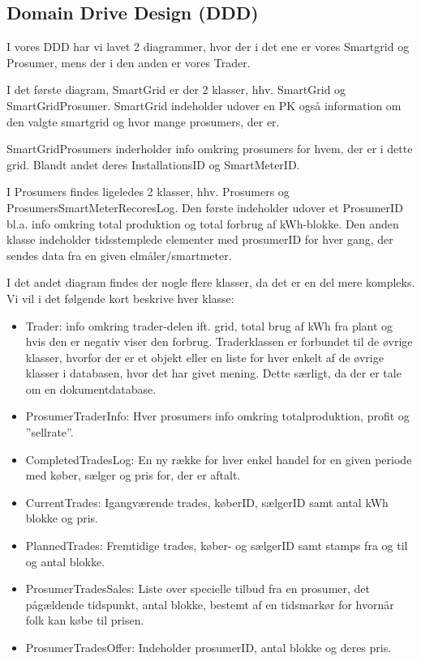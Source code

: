 
\subsection{Domain Drive Design (DDD)}

I vores DDD har vi lavet 2 diagrammer, hvor der i det ene er vores Smartgrid og Prosumer, mens der i  den anden er vores Trader.

I det første diagram, SmartGrid er der 2 klasser, hhv. SmartGrid og SmartGridProsumer. SmartGrid indeholder udover en PK også information om den valgte smartgrid og hvor mange prosumers, der er.

SmartGridProsumers inderholder info omkring prosumers for hvem, der er i dette grid. Blandt andet deres InstallationsID og SmartMeterID.

I Prosumers findes ligeledes 2 klasser, hhv. Prosumers og ProsumersSmartMeterRecoresLog.
Den første indeholder udover et ProsumerID bl.a. info omkring total produktion og total forbrug af kWh-blokke. Den anden klasse indeholder tidsstemplede elementer med prosumerID for hver gang, der sendes data fra en given elmåler/smartmeter.


I det andet diagram findes der nogle flere klasser, da det er en del mere kompleks. Vi vil i det følgende kort beskrive hver klasse:
\begin{itemize}

\item Trader: info omkring trader-delen ift. grid, total brug af kWh fra plant og hvis den er negativ viser den forbrug. Traderklassen er forbundet til de øvrige klasser, hvorfor der er et objekt eller en liste for hver enkelt af de øvrige klasser i databasen, hvor det har givet mening. Dette særligt, da der er tale om en dokumentdatabase.
\item ProsumerTraderInfo: Hver prosumers info omkring totalproduktion, profit og ”sellrate”.
\item CompletedTradesLog: En ny række for hver enkel handel for en given periode med køber, sælger og pris for, der er aftalt.
\item CurrentTrades: Igangværende trades, køberID, sælgerID samt antal kWh blokke og pris.
\item PlannedTrades: Fremtidige trades, køber- og sælgerID samt stamps fra og til og antal blokke.
\item ProsumerTradesSales: Liste over specielle tilbud fra en prosumer, det pågældende tidspunkt, antal blokke, bestemt af en tidsmarkør for hvornår folk kan købe til prisen. 
\item ProsumerTradesOffer: Indeholder prosumerID, antal blokke og deres pris.
\end{itemize}
 

